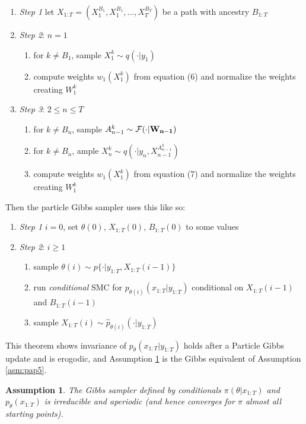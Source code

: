 \documentclass{article}\usepackage[]{graphicx}\usepackage[]{color}
\newtheorem{assumption}{Assumption}
\theoremstyle{definition}
\begin{document}
\begin{enumerate}
  \item[] \textit{Step 1} let $X_{1:T} = (X_1^{B_1}, X_1^{B_1},\ldots,X_T^{B_T})$ be a path with ancestry $B_{1:T}$
%
  \item[] \textit{Step 2}: $n=1$
  \begin{enumerate}
    \item for $k \neq B_1$, sample $X_1^k \sim q(\cdot|y_1)$
    \item compute weights $w_1(X^k_1)$ from equation (6) and normalize the weights creating $W_1^k$
  \end{enumerate}
%
  \item[] \textit{Step 3}: $2 \leq n \leq T$
  \begin{enumerate}
    \item for $k \neq B_n$, sample $A_{n-1}^k \sim \mathcal{F}(\cdot|{\bf W_{n-1}})$
    \item for $k \neq B_n$, ample $X_n^k \sim q(\cdot|y_n, X_{n-1}^{A_{n-1}^k})$
    \item compute weights $w_1(X^k_1)$ from equation (7) and normalize the weights creating $W_1^k$
  \end{enumerate}
\end{enumerate}

Then the particle Gibbs sampler uses this like so:
\begin{enumerate}
  \item[] \textit{Step 1} $i = 0$, set $\theta(0)$, $X_{1:T}(0)$, $B_{1:T}(0)$ to some values
%
  \item[] \textit{Step 2}: $i \geq 1$
  \begin{enumerate}
    \item sample $\theta(i) \sim p\{ \cdot | y_{1:T}, X_{1:T}(i-1) \}$
    \item run \textit{conditional} SMC for $p_{\theta(i)}(x_{1:T}|y_{1:T})$ conditional on $X_{1:T}(i-1)$ and $B_{1:T}(i-1)$
    \item sample $X_{1:T}(i) \sim \hat{p}_{\theta(i)}(\cdot|y_{1:T})$
  \end{enumerate}
\end{enumerate}


This theorem shows invariance of $p_\theta(x_{1:T}|y_{1:T})$ holds after a Particle Gibbs update and is erogodic, and Assumption \ref{asm:pap7} is the Gibbs equivalent of Assumption \ref{asm:pap5}.

\begin{assumption}\label{asm:pap7}
The Gibbs sampler defined by conditionals $\pi(\theta|x_{1:T})$ and $p_\theta(x_{1:T})$ is irreducible and aperiodic (and hence converges for $\pi$ almost all starting points).
\end{assumption}
\end{document}
